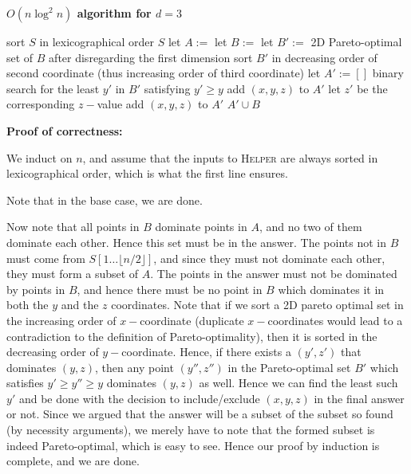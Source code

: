 \documentclass[answers]{exam}
\begin{document}
\begin{questions}
\begin{solution}
    \textbf{$O(n \log^2 n)$ algorithm for $d = 3$}
    \begin{algorithmic}
            \State sort $S$ in lexicographical order
                    \State \Return $S$
                \EndIf
                \State let $A :=$ 
                \State let $B :=$ 
                \State let $B' :=$ 2D Pareto-optimal set of $B$ after disregarding the first dimension
                \State sort $B'$ in decreasing order of second coordinate (thus increasing order of third coordinate)
                \State let $A' := []$
                    \State binary search for the least $y'$ in $B'$ satisfying $y' \ge y$
                        \State add $(x, y, z)$ to $A'$
                    \Else
                        \State let $z'$ be the corresponding $z-$value
                            \State add $(x, y, z)$ to $A'$
                        \EndIf
                    \EndIf
                \EndFor
                \State \Return $A' \cup B$
            \EndFunction
            \State \Return {}
        \EndFunction
    \end{algorithmic}

    \textbf{Proof of correctness:}

    We induct on $n$, and assume that the inputs to \textsc{Helper} are always sorted in lexicographical order, which is what the first line ensures.

    Note that in the base case, we are done.

    Now note that all points in $B$ dominate points in $A$, and no two of them dominate each other. Hence this set must be in the answer. The points not in $B$ must come from $S[1 \ldots
    \lfloor n/2 \rfloor]$, and since they must not dominate each other, they must form a subset of $A$. The points in the answer must not be dominated by points in $B$, and hence there must be no
    point in $B$ which dominates it in both the $y$ and the $z$ coordinates. Note that if we sort a 2D pareto optimal set in the increasing order of $x-$coordinate (duplicate $x-$coordinates
    would lead to a contradiction to the definition of Pareto-optimality), then it is sorted in the decreasing order of $y-$coordinate. Hence, if there exists a $(y', z')$ that dominates $(y, z)$,
    then any point $(y'', z'')$ in the Pareto-optimal set $B'$ which satisfies $y' \ge y'' \ge y$ dominates $(y, z)$ as well. Hence we can find the least such $y'$ and be done with the decision to
    include/exclude $(x, y, z)$ in the final answer or not.
    Since we argued that the answer will be a subset of the subset so found (by necessity arguments), we merely have to note that the formed subset is indeed Pareto-optimal, which is easy to
    see. Hence our proof by induction is complete, and we are done.


\end{solution}
\end{questions}
\end{document}
